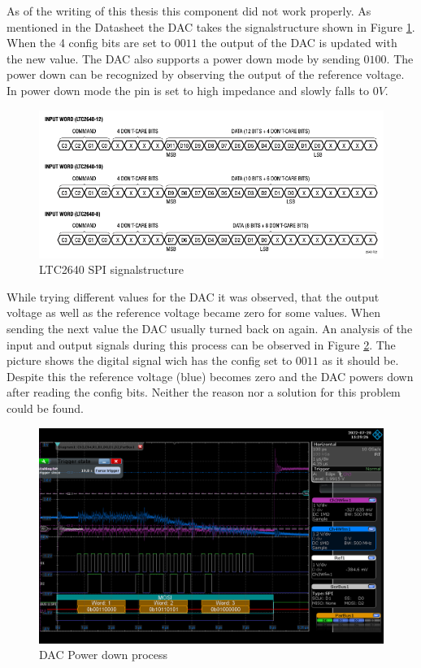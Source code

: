 As of the writing of this thesis this component did not work properly. As mentioned in the Datasheet the DAC takes the signalstructure shown in Figure \ref{fig:meas:circ:dac_spi}. When the 4 config bits are set to $0011$ the output of the DAC is updated with the new value. The DAC also supports a power down mode by sending $0100$. The power down can be recognized by observing the output of the reference voltage. In power down mode the pin is set to high impedance and slowly falls to $0V$.\cite{linear_technology_ltc2640_2017}
%
\begin{figure}
  \centering
  \includegraphics[width=\textwidth]{src/assets/pictures/measurements/dac_bit_structure.png}
  \caption{LTC2640 SPI signalstructure\cite{linear_technology_ltc2640_2017}}\label{fig:meas:circ:dac_spi}
\end{figure}
\p
While trying different values for the DAC it was observed, that the output voltage as well as the reference voltage became zero for some values. When sending the next value the DAC usually turned back on again. An analysis of the input and output signals during this process can be observed in Figure \ref{fig:meas:circ:dac_power_down}.\p
The picture shows the digital signal wich has the config set to $0011$ as it should be. Despite this the reference voltage (blue) becomes zero and the DAC powers down after reading the config bits. Neither the reason nor a solution for this problem could be found.
%
\begin{figure}
  \centering
  \includegraphics[height=\largeheight]{src/assets/pictures/measurements/dac_power_down.png}
  \caption{DAC Power down process}\label{fig:meas:circ:dac_power_down}
\end{figure}